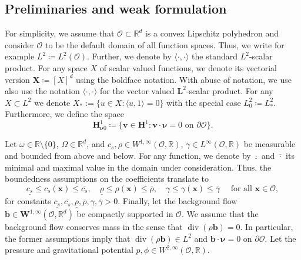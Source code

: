 \documentclass{m2an}
\newcommand{\dom}{\mathcal{O}} %
\newcommand{\nv}{\boldsymbol{\nu}}
\newcommand{\bflow}{\mathbf{b}}
\renewcommand{\v}{\mathbf{v}}
\renewcommand{\div}{\operatorname{div}}
\newcommand{\bH}{{\mathbf H}}
\newcommand{\bL}{\mathbf{L}}
\newcommand{\spl}{\langle}
\newcommand{\spr}{\rangle}
\theoremstyle{plain}
\theoremstyle{definition}
\begin{document}
\subsection{Preliminaries and weak formulation}\label{subsec:method:preliminaries}
For simplicity, we assume that $\dom \subset \mathbb{R}^d$ is a convex Lipschitz polyhedron and consider $\dom$ to be the default domain of all function spaces. Thus, we write for example $L^2 \coloneqq L^2(\dom)$. Further, we denote by $\spl \cdot, \cdot \spr$ the standard $L^2$-scalar product. For any space $X$ of scalar valued functions, we denote its vectorial version $\bm{X} \coloneqq [X]^d$ using the boldface notation. With abuse of notation, we use also use the notation $\spl \cdot, \cdot \spr$ for the vector valued $\bL^2$-scalar product. For any $X \subset L^2$ we denote $X_{\ast} := \{ u \in X \colon \spl u,1 \spr = 0 \}$ with the special case $L^2_{0} \coloneqq L^2_\ast$. Furthermore, we define the space 
\begin{equation}\label{eq:defH1nu0}
   \bH^1_{\nv 0} \coloneqq \{ \v \in \bH^1 : \v \cdot \nv = 0 \text{ on } \partial \dom \}.   
\end{equation}

Let $\omega \in \mathbb{R} \setminus \{ 0 \}$, $\Omega \in \mathbb{R}^d$, and $c_s, \rho \in W^{1,\infty}(\dom,\mathbb{R})$, $\gamma \in L^\infty(\dom,\mathbb{R})$ be measurable and bounded from above and below. For any function, we denote by $\underline{\cdot}$ and $\overline{\cdot}$ its minimal and maximal value in the domain under consideration. Thus, the boundedness assumptions on the coefficients translate to 
\begin{equation}\label{eq:CoeffsBounded}
   \underline{c_s} \le c_s(\bm{x}) \le \overline{c_s}, \quad \underline{\rho} \le \rho(\bm{x}) \le \overline{\rho}, \quad \underline{\gamma} \le \gamma(\bm{x}) \le \overline{\gamma} \quad \text{ for all } \bm{x} \in \dom, 
\end{equation}
for constants $\underline{c_s}, \overline{c_s}, \underline{\rho}, \overline{\rho}, \underline{\gamma}, \overline{\gamma} > 0$. 
Finally, let the background flow $\bflow \in \bm{W}^{1,\infty}(\dom,\mathbb{R}^d)$ be compactly supported in $\dom$.
We assume that the background flow conserves mass in the sense that $\div(\rho \bflow) = 0$. In particular, the former assumptions imply that $\div(\rho \bflow) \in L^2$ and $\bflow \cdot \nv = 0$ on $\partial \dom$.
Let the pressure and gravitational potential $p,\phi \in W^{2,\infty}(\dom,\mathbb{R})$.
\end{document}
